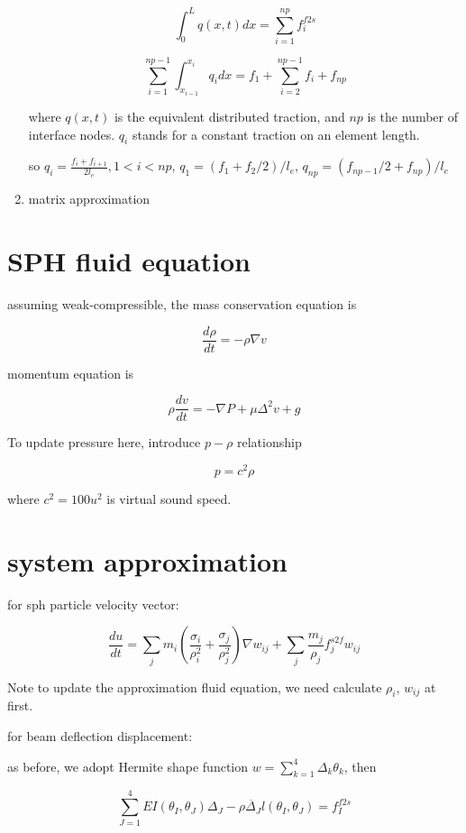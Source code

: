 \documentclass[11pt]{article}
\begin{document}
\begin{enumerate}
$$  \int_0^L q(x,t) dx = \sum_{i=1}^{np} f^{f2s}_i $$

$$ \sum_{i=1}^{np-1} \int_{x_{i-1}}^{x_i} q_i dx = f_1 + \sum_{i=2}^{np-1} f_i + f_{np}$$ 

where $ q(x,t)$ is the equivalent distributed traction, and $np$ is the number of interface nodes. $q_i$ stands for a constant traction on an element length. 

so $q_i = \frac{f_i + f_{i+1}}{2l_e}, 1< i < np$,  $q_1 = (f_1 + f_2/2)/ l_e$, $q_{np} = (f_{np-1}/2 + f_{np})/l_e $

\item{matrix approximation}



 
\end{enumerate}

\section{SPH fluid equation}

assuming weak-compressible, the mass conservation equation is

$$ \frac{d \rho}{dt} = - \rho \nabla  v $$

momentum equation is 

$$ \rho \frac{dv}{dt} = - \nabla P + \mu \Delta^2 v + g $$

To update pressure here, introduce $p-\rho$ relationship

$$ p = c^2 \rho$$

where $ c^2 = 100 u^2 $ is virtual sound speed. 


\section{system approximation}

for sph particle velocity vector:

$$ \frac{du}{dt} = \sum_j m_i( \frac{\sigma_i}{\rho ^2 _i } + \frac{\sigma_j}{\rho^2 _j} )\nabla w_{ij} + \sum_j \frac{m_j}{\rho _j} f^{s2f}_j w_{ij} $$

Note to update the approximation fluid equation, we need calculate $\rho_i$, $w_{ij}$ at first.


for beam deflection displacement:

as before, we adopt Hermite shape function $ w = \sum_{k=1}^4 \Delta_k \theta_k $, then

$$ \sum_{J=1}^4 EI(\theta_I, \theta_J) \Delta_J - \rho \ddot{\Delta_J} l(\theta_I, \theta_J) = f_I^{f2s} $$
\end{document}
